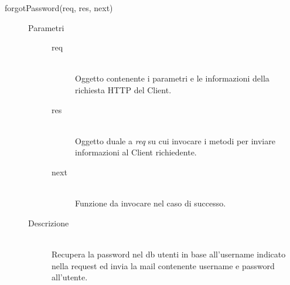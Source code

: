 \begin{description}
\begin{description}
     \item[forgotPassword(req, res, next)] \hfill 
          \begin{description}
          \item[Parametri] \hfill
          \begin{description}
          \item[req] \hfill \\
          	         Oggetto contenente i parametri e le informazioni della richiesta HTTP del Client.
          	         \item[res] \hfill \\
          	         Oggetto duale a \textit{req} su cui invocare i metodi per inviare informazioni al Client richiedente.
                       \item[next] \hfill \\
                       Funzione da invocare nel caso di successo.
          \end{description}
          \item[Descrizione] \hfill \\
          Recupera la password nel db utenti in base all'username indicato nella request ed invia la mail contenente username e password all'utente.
          \end{description}
                 

\end{description}
\end{description}
